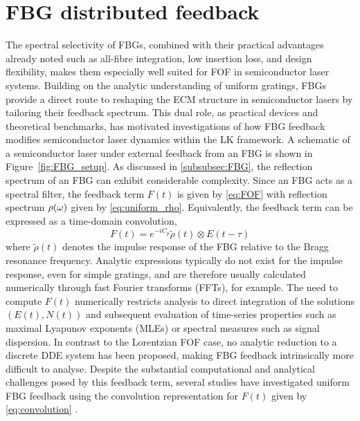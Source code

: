 \section*{FBG distributed feedback}
\label{sec:FBG_feedback}
%
The spectral selectivity of FBGs, combined with their practical advantages already noted such as all-fibre integration, low insertion loss, and design flexibility, makes them especially well suited for FOF in semiconductor laser systems. 
Building on the analytic understanding of uniform gratings, FBGs provide a direct route to reshaping the ECM structure in semiconductor lasers by tailoring their feedback spectrum. 
This dual role, as practical devices and theoretical benchmarks, has motivated investigations of how FBG feedback modifies semiconductor laser dynamics within the LK framework.
A schematic of a semiconductor laser under external feedback from an FBG is shown in Figure~\ref{fig:FBG_setup}.
As discussed in \ref{subsubsec:FBG}, the reflection spectrum of an FBG can exhibit considerable complexity. 
Since an FBG acts as a spectral filter, the feedback term $F(t)$ is given by \eqref{eq:FOF} with reflection spectrum $\rho(\omega)$ given by \eqref{eq:uniform_rho}.
Equivalently, the feedback term can be expressed as a time-domain convolution,
%
\begin{equation}
    \label{eq:convolution}
     F(t) = e^{-i C_p} \tilde{\rho}(t) \otimes E(t-\tau)
\end{equation}
%
where $\tilde{\rho}(t)$ denotes the impulse response of the FBG relative to the Bragg resonance frequency.
Analytic expressions typically do not exist for the impulse response, even for simple gratings, and are therefore usually calculated numerically through fast Fourier transforms (FFTs), for example.
The need to compute $F(t)$ numerically restricts analysis to direct integration of the solutions $(E(t),N(t))$ and subsequent evaluation of time-series properties such as maximal Lyapunov exponents (MLEs) or spectral measures such as signal dispersion.
In contrast to the Lorentzian FOF case, no analytic reduction to a discrete DDE system has been proposed, making FBG feedback intrinsically more difficult to analyse.
Despite the substantial computational and analytical challenges posed by this feedback term, several studies have investigated uniform FBG feedback using the convolution representation for $F(t)$ given by \eqref{eq:convolution} \cite{li2012distributed, li2015chaotic, li2020stable, jiang2021characterizing, skenderas2021feedback, skenderas2024impact}.
%
\par
